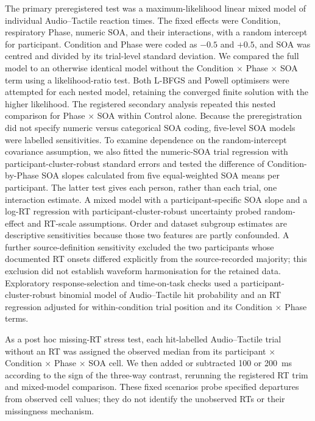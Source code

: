 The primary preregistered test was a maximum-likelihood linear mixed model of individual Audio--Tactile reaction times. The fixed effects were Condition, respiratory Phase, numeric SOA, and their interactions, with a random intercept for participant. Condition and Phase were coded as $-0.5$ and $+0.5$, and SOA was centred and divided by its trial-level standard deviation. We compared the full model to an otherwise identical model without the Condition $\times$ Phase $\times$ SOA term using a likelihood-ratio test. Both L-BFGS and Powell optimisers were attempted for each nested model, retaining the converged finite solution with the higher likelihood. The registered secondary analysis repeated this nested comparison for Phase $\times$ SOA within Control alone. Because the preregistration did not specify numeric versus categorical SOA coding, five-level SOA models were labelled sensitivities. To examine dependence on the random-intercept covariance assumption, we also fitted the numeric-SOA trial regression with participant-cluster-robust standard errors and tested the difference of Condition-by-Phase SOA slopes calculated from five equal-weighted SOA means per participant. The latter test gives each person, rather than each trial, one interaction estimate. A mixed model with a participant-specific SOA slope and a log-RT regression with participant-cluster-robust uncertainty probed random-effect and RT-scale assumptions. Order and dataset subgroup estimates are descriptive sensitivities because those two features are partly confounded. A further source-definition sensitivity excluded the two participants whose documented RT onsets differed explicitly from the source-recorded majority; this exclusion did not establish waveform harmonisation for the retained data. Exploratory response-selection and time-on-task checks used a participant-cluster-robust binomial model of Audio--Tactile hit probability and an RT regression adjusted for within-condition trial position and its Condition $\times$ Phase terms.

As a post hoc missing-RT stress test, each hit-labelled Audio--Tactile trial without an RT was assigned the observed median from its participant $\times$ Condition $\times$ Phase $\times$ SOA cell. We then added or subtracted 100 or 200~ms according to the sign of the three-way contrast, rerunning the registered RT trim and mixed-model comparison. These fixed scenarios probe specified departures from observed cell values; they do not identify the unobserved RTs or their missingness mechanism.

